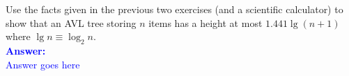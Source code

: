 \item{}
Use the facts given in the previous two exercises (and a scientific calculator)
to show that an AVL tree storing $n$ items has a height at most $1.441\lg(n+1)$
where $\lg n\equiv\log_2n$.\\[12pt]
\ifanswers
\textcolor{blue}{
\textbf{Answer:}\\[6pt]
Answer goes here
}
\newpage
\fi
